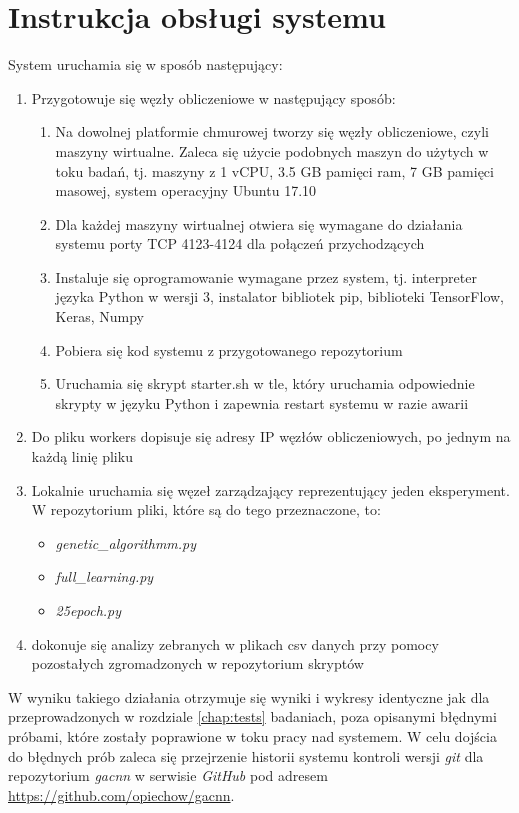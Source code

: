 \chapter[Dodatek C]{Instrukcja obsługi systemu}

System uruchamia się w sposób następujący:
\begin{enumerate}
  \item Przygotowuje się węzły obliczeniowe w następujący sposób:
  \begin{enumerate}
    \item Na dowolnej platformie chmurowej tworzy się węzły obliczeniowe, czyli maszyny wirtualne.
    Zaleca się użycie podobnych maszyn do użytych w toku badań, tj. maszyny z 1 vCPU, 3.5 GB pamięci ram, 7 GB pamięci masowej, system operacyjny Ubuntu 17.10
    \item Dla każdej maszyny wirtualnej otwiera się wymagane do działania systemu porty TCP 4123-4124 dla połączeń przychodzących
    \item Instaluje się oprogramowanie wymagane przez system, tj. interpreter języka Python w wersji 3, instalator bibliotek pip, biblioteki TensorFlow, Keras, Numpy
    \item Pobiera się kod systemu z przygotowanego repozytorium
    \item Uruchamia się skrypt starter.sh w tle, który uruchamia odpowiednie skrypty w języku Python i zapewnia restart systemu w razie awarii
  \end{enumerate}
  \item Do pliku workers dopisuje się adresy IP węzłów obliczeniowych, po jednym na każdą linię pliku
  \item Lokalnie uruchamia się węzeł zarządzający reprezentujący jeden eksperyment.
  W repozytorium pliki, które są do tego przeznaczone, to:
  \begin{itemize}
    \item \textit{genetic\_algorithmm.py}
    \item \textit{full\_learning.py}
    \item \textit{25epoch.py}
  \end{itemize}
  \item dokonuje się analizy zebranych w plikach csv danych przy pomocy pozostałych zgromadzonych w repozytorium skryptów
\end{enumerate}
W wyniku takiego działania otrzymuje się wyniki i wykresy identyczne jak dla przeprowadzonych w rozdziale \ref{chap:tests} badaniach, poza opisanymi błędnymi próbami, które zostały poprawione w toku pracy nad systemem.
W celu dojścia do błędnych prób zaleca się przejrzenie historii systemu kontroli wersji \textit{git} dla repozytorium \textit{gacnn} w serwisie \textit{GitHub} pod adresem \url{https://github.com/opiechow/gacnn}.
